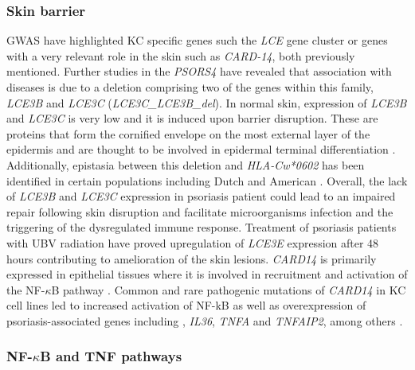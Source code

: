 
\subsubsection{Skin barrier}
GWAS have highlighted KC specific genes such the \textit{LCE} gene cluster or genes with a very relevant role in the skin such as \textit{CARD-14}, both previously mentioned. Further studies in the \textit{PSORS4} have revealed that association with diseases is due to a deletion comprising two of the genes within this family, \textit{LCE3B} and \textit{LCE3C} (\textit{LCE3C_LCE3B_del})\parencite{Cid2009}. In normal skin, expression of \textit{LCE3B} and \textit{LCE3C} is very low and it is induced upon barrier disruption. These are proteins that form the cornified envelope on the most external layer of the epidermis and are thought to be involved in epidermal terminal differentiation \parencite{Bergboer2011}. Additionally, epistasia between this deletion and \textit{HLA-Cw*0602} has been identified in certain populations including Dutch and American \parencite{Cid2009, Riveira-Munoz2011}. Overall, the lack of \textit{LCE3B} and \textit{LCE3C} expression in psoriasis patient could lead to an impaired repair following skin disruption and facilitate microorganisms infection and the triggering of the dysregulated immune response. Treatment of psoriasis patients with UBV radiation have proved upregulation of \textit{LCE3E} expression after 48 hours contributing to amelioration of the skin lesions\parencite{Jackson2005}. \textit{CARD14} is primarily expressed in epithelial tissues where it is involved in recruitment and activation of the NF-$\kappa$B pathway \parencite{Blonska2011}. Common and rare pathogenic mutations of \textit{CARD14} in KC cell lines led to increased activation of NF-kB as well as overexpression of psoriasis-associated genes including , \textit{IL36}, \textit{TNFA} and \textit{TNFAIP2}, among others \parencite{Jordan2012b}.


\subsubsection{NF-$\kappa$B and TNF pathways}

